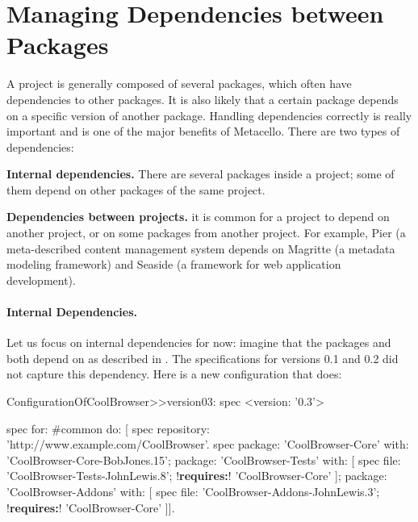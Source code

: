 \documentclass[a4paper,10pt,twoside]{book}
\begin{document}
\section{Managing Dependencies between Packages}

A project is generally composed of several packages, which often have dependencies to other packages.  It is also likely that a certain package depends on a specific version of another package. Handling dependencies correctly is really important and  is one of the major benefits of Metacello. There are two types of dependencies:
\begin{description}
\item \textbf{Internal dependencies.} There are several packages inside a project; some of them depend on other packages of the same project. 
\item \textbf{Dependencies between projects.} it is common for a project to depend on another project, or on some packages from another project. 
For example, Pier (a meta-described content management system depends on Magritte (a metadata modeling framework) and Seaside (a framework for web application development).
\end{description}



\paragraph{Internal Dependencies.} Let us focus on internal dependencies for now: imagine that the packages  and  both depend on  as described in . The specifications for versions 0.1 and 0.2 did not capture this dependency. Here is a new configuration that does:

\begin{code}{}
ConfigurationOfCoolBrowser>>version03: spec 
       <version: '0.3'>
       
       spec for: #common do: [
              spec repository: 'http://www.example.com/CoolBrowser'.
              spec 
                     package: 'CoolBrowser-Core' with: 'CoolBrowser-Core-BobJones.15';
                     package: 'CoolBrowser-Tests' with: [
                            spec 
                                   file: 'CoolBrowser-Tests-JohnLewis.8';
                                   !\textbf{requires:}! 'CoolBrowser-Core' ];
                     package: 'CoolBrowser-Addons' with: [
                            spec 
                                   file: 'CoolBrowser-Addons-JohnLewis.3';
                                   !\textbf{requires:}! 'CoolBrowser-Core' ]].
\end{code}
\end{document}
